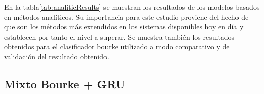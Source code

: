 
En la tabla\ref{tab:analiticResults} se muestran los resultados de los modelos basados en métodos analíticos. Su importancia para este estudio proviene del hecho de que son los métodos más extendidos en los sistemas disponibles hoy en día y establecen por tanto el nivel a superar. Se muestra también los resultados obtenidos para el clasificador bourke utilizado a modo comparativo y de validación del resultado obtenido.

\begin{comment}
\tablas{tab:analiticResults}{Resultados de sistemas basados en métodos analíticos}{l|c|c|c|c}{
              & Yo        & Yo      & SisFALL & SisFALL \\
              & Bourke    & Hibrido & Cotas(SumVect)  & Cotas(SV) 100\%Sens \\ \midrule
Sensitividad (\%) & 99,4  &    91,13   & 94,28 & 100  \\
Especificidad (\%) & 29,7 &   42,88    & 96,13 & 32,9 \\
Accuracy (\%) & 64,55 &     67  & 95,21 & 66,43 \\
Tiempo (s)    & 0     & 2,5     & 0       & \\
}
\warn{Falta extraer Lim2014 con sisfall y comparar}
\end{comment}
\subsection{Mixto Bourke + GRU}




